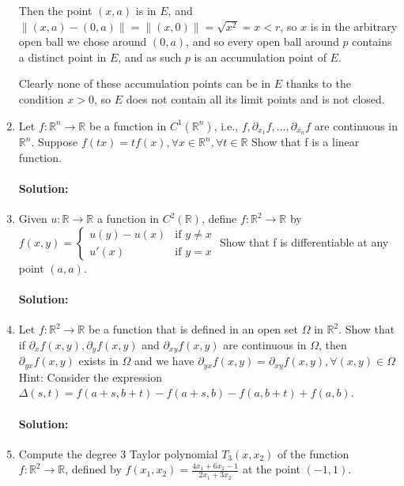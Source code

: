 \documentclass{article}
\begin{document}
\begin{enumerate}
    Then the point $(x,a)$ is in $E$, and $\|(x,a)-(0,a)\|=\|(x,0)\|=\sqrt{x^2} =x<r$, so $x$ is in the arbitrary open ball we chose around $(0,a)$, and so every open ball around $p$ contains a distinct point in $E$, and as such $p$ is an accumulation point of $E$.

    Clearly none of these accumulation points can be in $E$ thanks to the condition $x>0$, so $E$ does not contain all its limit points and is not closed.

\item Let $f : \mathbb{R}^n \to \mathbb{R}$ be a function in $C^1(\mathbb{R}^n)$, i.e., $f, \partial_{x_1} f, ..., \partial_{x_n} f$ are continuous in $\mathbb{R}^n$. Suppose  $f(tx) = t f(x), \forall x \in \mathbb{R}^n, \forall t \in \mathbb{R}$  Show that f is a linear function.  
    \paragraph{Solution: }

\item Given $u : \mathbb{R} \to \mathbb{R}$ a function in $C^2(\mathbb{R})$, define $f : \mathbb{R}^2 \to \mathbb{R}$ by  $f(x,y) = \begin{cases} u(y) - u(x) & \text{if } y \neq x \\ u'(x) & \text{if } y = x \end{cases}$  Show that f is differentiable at any point $(a,a)$.  
    \paragraph{Solution: } %

\item Let $f : \mathbb{R}^2 \to \mathbb{R}$ be a function that is defined in an open set $\Omega$ in $\mathbb{R}^2$.  Show that if $\partial_x f(x,y), \partial_y f(x,y)$ and $\partial_{xy} f(x,y)$ are continuous in $\Omega$, then $\partial_{yx} f(x,y)$ exists in $\Omega$ and we have  $\partial_{yx} f(x,y) = \partial_{xy} f(x,y), \forall (x,y) \in \Omega$  Hint: Consider the expression $\Delta(s,t) = f(a+s,b+t) - f(a+s,b) - f(a,b+t) + f(a,b)$.  
    \paragraph{Solution: } %

\item Compute the degree 3 Taylor polynomial $T_3(x,x_2)$ of the function $f: \mathbb{R}^2 \to \mathbb{R}$, defined by $f(x_1, x_2) = \frac{4x_1 + 6x_2 - 1}{2x_1 + 3x_2}$ at the point $(-1,1).$

\end{enumerate}
\end{document}
